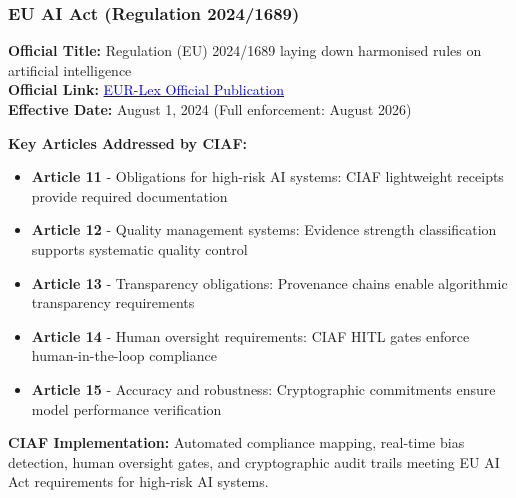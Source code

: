 \documentclass[12pt,a4paper]{article}
\begin{document}
\subsubsection{EU AI Act (Regulation 2024/1689)}
\begin{valuebox}
\textbf{Official Title:} Regulation (EU) 2024/1689 laying down harmonised rules on artificial intelligence\\
\textbf{Official Link:} \href{https://eur-lex.europa.eu/eli/reg/2024/1689/oj}{\textcolor{blue}{EUR-Lex Official Publication}}\\
\textbf{Effective Date:} August 1, 2024 (Full enforcement: August 2026)

\textbf{Key Articles Addressed by CIAF:}
\begin{itemize}
\item \textbf{Article 11} - Obligations for high-risk AI systems: CIAF lightweight receipts provide required documentation
\item \textbf{Article 12} - Quality management systems: Evidence strength classification supports systematic quality control
\item \textbf{Article 13} - Transparency obligations: Provenance chains enable algorithmic transparency requirements
\item \textbf{Article 14} - Human oversight requirements: CIAF HITL gates enforce human-in-the-loop compliance
\item \textbf{Article 15} - Accuracy and robustness: Cryptographic commitments ensure model performance verification
\end{itemize}

\textbf{CIAF Implementation:} Automated compliance mapping, real-time bias detection, human oversight gates, and cryptographic audit trails meeting EU AI Act requirements for high-risk AI systems.
\end{valuebox}
\end{document}
